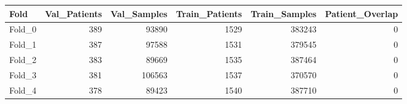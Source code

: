 \begin{tabular}{lrrrrr}
\toprule
Fold & Val\_Patients & Val\_Samples & Train\_Patients & Train\_Samples & Patient\_Overlap \\
\midrule
Fold\_0 & 389 & 93890 & 1529 & 383243 & 0 \\
Fold\_1 & 387 & 97588 & 1531 & 379545 & 0 \\
Fold\_2 & 383 & 89669 & 1535 & 387464 & 0 \\
Fold\_3 & 381 & 106563 & 1537 & 370570 & 0 \\
Fold\_4 & 378 & 89423 & 1540 & 387710 & 0 \\
\bottomrule
\end{tabular}

